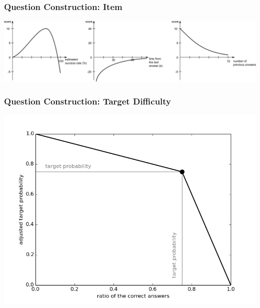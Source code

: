 \documentclass[xcolor=svgnames]{beamer}
\begin{document}
\begin{frame}
	\frametitle{Question Construction: Item}
	\includegraphics[width=\textwidth]{score-functions}
\end{frame}
\begin{frame}
	\frametitle{Question Construction: Target Difficulty}
	\includegraphics[width=\textwidth]{target_probability_adjustment}
\end{frame}
\end{document}
